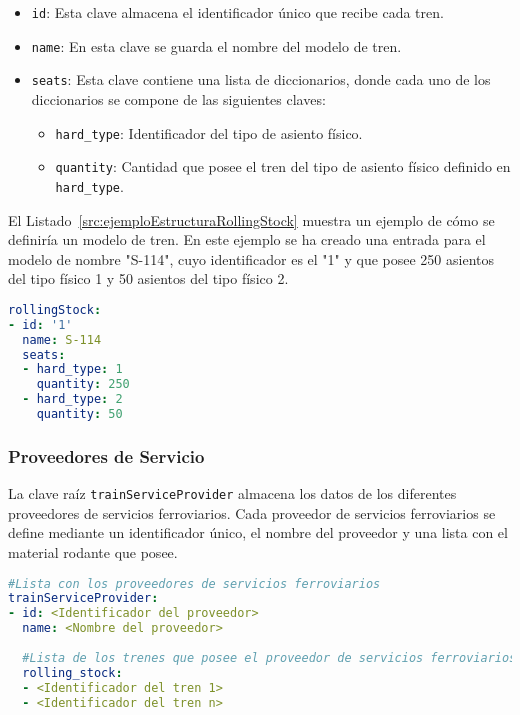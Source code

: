 \begin{itemize}
    \item \texttt{id}: Esta clave almacena el identificador único que recibe cada tren.
    \item \texttt{name}: En esta clave se guarda el nombre del modelo de tren.
    \item \texttt{seats}: Esta clave contiene una lista de diccionarios, donde cada uno de los diccionarios se compone de las siguientes claves:
        \begin{itemize}
            \item \texttt{hard\_type}: Identificador del tipo de asiento físico.
            \item \texttt{quantity}: Cantidad que posee el tren del tipo de asiento físico definido en \texttt{hard\_type}.   
        \end{itemize}    
\end{itemize}

El Listado~\ref{src:ejemploEstructuraRollingStock} muestra un ejemplo de cómo se definiría un modelo de tren. En este ejemplo se ha creado una entrada para el modelo de nombre "S-114", cuyo identificador es el "1" y que posee 250 asientos del tipo físico 1 y 50 asientos del tipo físico 2.

\begin{lstlisting}[language=YAML,
                   frame=none,
                   numbers=none,
                   basicstyle=\ttfamily\normalsize,
                   caption={Ejemplo con datos reales de la estructura de \texttt{rollingStock}},
                   label=src:ejemploEstructuraRollingStock,
                   inputencoding=utf8]
rollingStock:
- id: '1'
  name: S-114
  seats:
  - hard_type: 1
    quantity: 250
  - hard_type: 2
    quantity: 50
\end{lstlisting}

\subsubsection{Proveedores de Servicio}

La clave raíz \texttt{trainServiceProvider} almacena los datos de los diferentes proveedores de servicios ferroviarios. Cada proveedor de servicios ferroviarios se define mediante un identificador único, el nombre del proveedor y una lista con el material rodante que posee.

\begin{lstlisting}[language=YAML,
                   frame=none,
                   numbers=none,
                   basicstyle=\ttfamily\normalsize,
                   caption={Estructura de la clave raíz \texttt{trainServiceProvider}},
                   label=src:estructuraTSP,
                   inputencoding=utf8]
#Lista con los proveedores de servicios ferroviarios
trainServiceProvider:
- id: <Identificador del proveedor>
  name: <Nombre del proveedor>
  
  #Lista de los trenes que posee el proveedor de servicios ferroviarios
  rolling_stock:
  - <Identificador del tren 1>
  - <Identificador del tren n>
\end{lstlisting}

